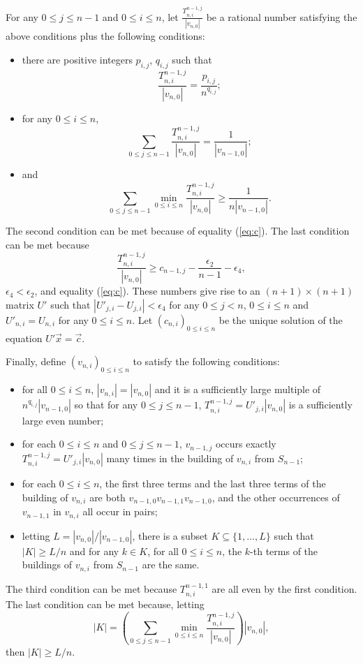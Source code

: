 \documentclass{amsart}
\theoremstyle{definition}
\theoremstyle{problem}
\theoremstyle{remark}
\numberwithin{equation}{section}
\begin{document}
For any $0\le j\le n-1$ and $0\le i\le n$, let $\frac{T^{n-1,j}_{n,i}}{|v_{n,0}|}$ be a rational number satisfying the above conditions plus the following conditions:
\begin{itemize}
\item there are positive integers $p_{i,j}$, $q_{i,j}$ such that 
$$\frac{T^{n-1,j}_{n,i}}{|v_{n,0}|}=\frac{p_{i,j}}{n^{q_{i,j}}};$$
\item for any $0\le i\le n$,
$$\sum_{0\le j \le n-1}\frac{T^{n-1,j}_{n,i}}{|v_{n,0}|}=\frac{1}{|v_{n-1,0}|};$$
\item and
$$ \displaystyle\sum_{0\leq j\leq n-1}\min_{0\leq i\leq n}\displaystyle\frac{T^{n-1,j}_{n,i}}{|v_{n,0}|}\geq \displaystyle\frac{1}{n|v_{n-1,0}|}. $$
\end{itemize}
The second condition can be met because of equality (\ref{eq:c}). The last condition can be met because
$$ \displaystyle\frac{T^{n-1,j}_{n,i}}{|v_{n,0}|}\geq c_{n-1,j}-\frac{\epsilon_2}{n-1}-\epsilon_4, $$
$\epsilon_4<\epsilon_2$, and equality (\ref{eq:c}). 
These numbers give rise to an $(n+1)\times (n+1)$ matrix $U'$ such that $|U'_{j,i}-U_{j,i}|<\epsilon_4$ for any $0\le j<n$, $0\le i \le n$ and $U'_{n,i}=U_{n,i}$ for any $0\le i\le  n$. Let $(c_{n,i})_{0\le i\le n}$ be the unique solution of the equation $U'\vec{x}=\vec{c}$. 

Finally, define $(v_{n,i})_{0\leq i\leq n}$ to satisfy the following conditions:
\begin{itemize}
\item for all $0\leq i\leq n$, $|v_{n,i}|=|v_{n,0}|$ and it is a sufficiently large multiple of $n^{q_{i,j}}|v_{n-1,0}|$ so that for any $0\leq j\leq n-1$, $T^{n-1,j}_{n,i}=U'_{j,i}|v_{n,0}|$ is a sufficiently large even number;
\item for each $0\leq i\leq n$ and $0\leq j\leq n-1$, $v_{n-1,j}$ occurs exactly $T^{n-1,j}_{n,i}=U'_{j,i}|v_{n,0}|$ many times in the building of $v_{n,i}$ from $S_{n-1}$;
\item for each $0\leq i\leq n$, the first three terms and the last three terms of the building of $v_{n,i}$ are both $v_{n-1,0}v_{n-1,1}v_{n-1,0}$, and the other occurrences of $v_{n-1,1}$ in $v_{n,i}$ all occur in pairs;
\item letting $L=|v_{n,0}|/|v_{n-1,0}|$, there is a subset $K\subseteq \{1, \dots, L\}$ such that $|K|\geq L/n$ and for any $k\in K$, for all $0\leq i\leq n$, the $k$-th terms of the buildings of $v_{n,i}$ from $S_{n-1}$ are the same.
\end{itemize}
The third condition can be met because $T^{n-1,1}_{n,i}$ are all even by the first condition. The last condition can be met because, letting 
$$ |K|=\left(\displaystyle\sum_{0\leq j\leq n-1}\min_{0\leq i\leq n}\displaystyle\frac{T^{n-1,j}_{n,i}}{|v_{n,0}|}\right)|v_{n,0}|, $$
then $|K|\geq L/n$.
\end{document}
